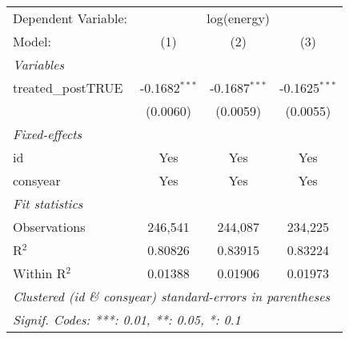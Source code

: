 
\begingroup
\centering
\begin{tabular}{lccc}
   \tabularnewline \midrule \midrule
   Dependent Variable: & \multicolumn{3}{c}{log(energy)}\\
   Model:             & (1)             & (2)             & (3)\\  
   \midrule
   \emph{Variables}\\
   treated\_postTRUE  & -0.1682$^{***}$ & -0.1687$^{***}$ & -0.1625$^{***}$\\   
                      & (0.0060)        & (0.0059)        & (0.0055)\\   
   \midrule
   \emph{Fixed-effects}\\
   id                 & Yes             & Yes             & Yes\\  
   consyear           & Yes             & Yes             & Yes\\  
   \midrule
   \emph{Fit statistics}\\
   Observations       & 246,541         & 244,087         & 234,225\\  
   R$^2$              & 0.80826         & 0.83915         & 0.83224\\  
   Within R$^2$       & 0.01388         & 0.01906         & 0.01973\\  
   \midrule \midrule
   \multicolumn{4}{l}{\emph{Clustered (id \& consyear) standard-errors in parentheses}}\\
   \multicolumn{4}{l}{\emph{Signif. Codes: ***: 0.01, **: 0.05, *: 0.1}}\\
\end{tabular}
\par\endgroup


